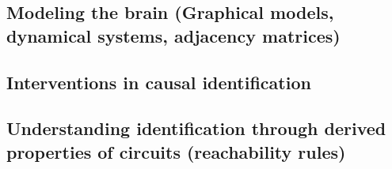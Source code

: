 
\subsection{Modeling the brain (Graphical models, dynamical systems, adjacency matrices)}

\subsection{Interventions in causal identification}

\subsection{Understanding identification through derived properties of circuits (reachability rules)}

